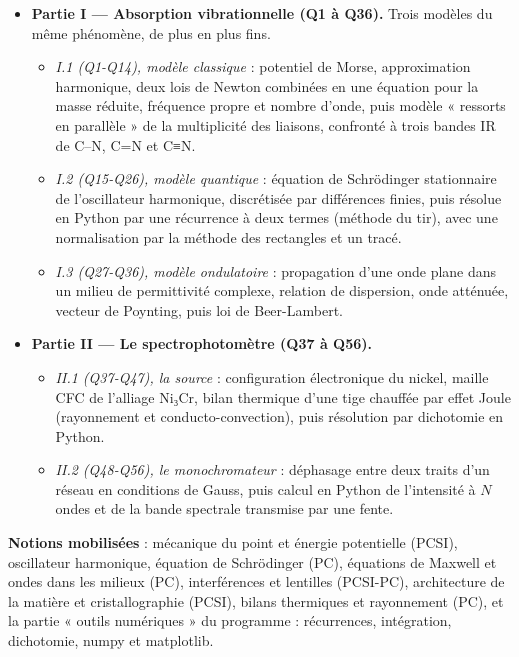 \documentclass[11pt,a4paper]{article}
\providecommand{\tightlist}{\setlength{\itemsep}{0pt}\setlength{\parskip}{0pt}}
\begin{document}
\begin{itemize}
\tightlist
\item
  \textbf{Partie I --- Absorption vibrationnelle (Q1 à Q36).} Trois modèles du même phénomène, de plus en plus fins.

  \begin{itemize}
  \tightlist
  \item
    \emph{I.1 (Q1-Q14), modèle classique} : potentiel de Morse, approximation harmonique, deux lois de Newton combinées en une équation pour la masse réduite, fréquence propre et nombre d'onde, puis modèle « ressorts en parallèle » de la multiplicité des liaisons, confronté à trois bandes IR de C--N, C=N et C≡N.
  \item
    \emph{I.2 (Q15-Q26), modèle quantique} : équation de Schrödinger stationnaire de l'oscillateur harmonique, discrétisée par différences finies, puis résolue en Python par une récurrence à deux termes (méthode du tir), avec une normalisation par la méthode des rectangles et un tracé.
  \item
    \emph{I.3 (Q27-Q36), modèle ondulatoire} : propagation d'une onde plane dans un milieu de permittivité complexe, relation de dispersion, onde atténuée, vecteur de Poynting, puis loi de Beer-Lambert.
  \end{itemize}
\item
  \textbf{Partie II --- Le spectrophotomètre (Q37 à Q56).}

  \begin{itemize}
  \tightlist
  \item
    \emph{II.1 (Q37-Q47), la source} : configuration électronique du nickel, maille CFC de l'alliage Ni₃Cr, bilan thermique d'une tige chauffée par effet Joule (rayonnement et conducto-convection), puis résolution par dichotomie en Python.
  \item
    \emph{II.2 (Q48-Q56), le monochromateur} : déphasage entre deux traits d'un réseau en conditions de Gauss, puis calcul en Python de l'intensité à \(N\) ondes et de la bande spectrale transmise par une fente.
  \end{itemize}
\end{itemize}

\textbf{Notions mobilisées} : mécanique du point et énergie potentielle (PCSI), oscillateur harmonique, équation de Schrödinger (PC), équations de Maxwell et ondes dans les milieux (PC), interférences et lentilles (PCSI-PC), architecture de la matière et cristallographie (PCSI), bilans thermiques et rayonnement (PC), et la partie « outils numériques » du programme : récurrences, intégration, dichotomie, numpy et matplotlib.
\end{document}
